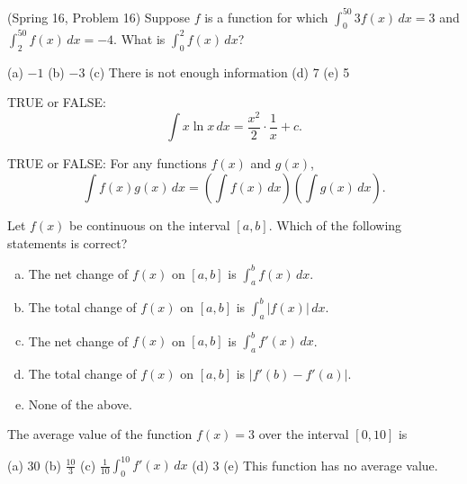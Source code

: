 \documentclass[12pt]{article}
\newcommand{\ds}{\displaystyle}
\newenvironment{problem}[2][Problem]{\begin{trivlist}
\item[\hskip \labelsep {\bfseries #1}\hskip \labelsep {\bfseries #2.}]}{\end{trivlist}}
\begin{document}
\vspace{1in}

\begin{problem}{8}
(Spring 16, Problem 16) Suppose $f$ is a function for which $\ds\int_{0}^{50}\! 3f(x)\, dx = 3$ and $\ds\int_{2}^{50}\! f(x)\, dx = -4$. What is $\ds\int_{0}^{2}\! f(x)\, dx$? 
\begin{center}
  (a) $-1$ \qquad
  (b) $-3$ \qquad
  (c) There is not enough information \qquad
  (d) 7 \qquad
  (e) 5
\end{center}
\end{problem}

\vspace{2in}

\begin{problem}{9}
TRUE or FALSE: 
$$
\int\! x\ln x\, dx = \frac{x^{2}}{2}\cdot\frac{1}{x} + c. 
$$
\end{problem}

\newpage

\begin{problem}{10}
TRUE or FALSE: For any functions $f(x)$ and $g(x)$, 
$$
\int\! f(x)g(x)\, dx = \left (\int\! f(x)\, dx\right )\left (\int\! g(x)\, dx\right ). 
$$
\end{problem}

\vspace{1in}

\begin{problem}{11}
Let $f(x)$ be continuous on the interval $[a,b]$. Which of the following statements is correct? 
\begin{enumerate}[(a)]
  \item The net change of $f(x)$ on $[a,b]$ is $\ds\int_{a}^{b}\! f(x)\, dx$. 
  \item The total change of $f(x)$ on $[a,b]$ is $\ds\int_{a}^{b}\! |f(x)|\, dx$. 
  \item The net change of $f(x)$ on $[a,b]$ is $\ds\int_{a}^{b}\! f'(x)\, dx$. 
  \item The total change of $f(x)$ on $[a,b]$ is $|f'(b) - f'(a)|$. 
  \item None of the above. 
\end{enumerate}
\end{problem}

\vspace{1in}

\begin{problem}{12}
The average value of the function $f(x) = 3$ over the interval $[0,10]$ is 
\begin{center}
  (a) 30 \quad
  (b) $\ds\frac{10}{3}$ \quad
  (c) $\ds\frac{1}{10}\int_{0}^{10}\! f'(x)\, dx$ \quad
  (d) 3 \quad
  (e) This function has no average value. 
\end{center}
\end{problem}
\end{document}
